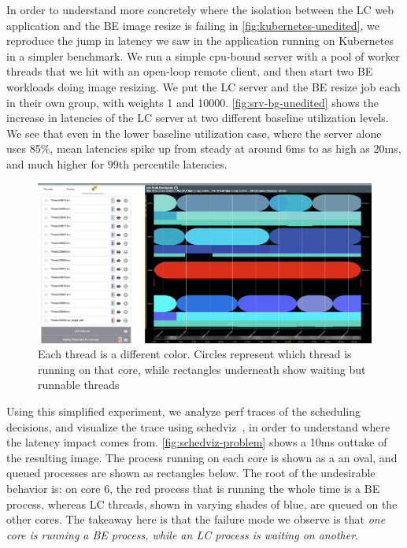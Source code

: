 In order to understand more concretely where the isolation between the LC web
application and the BE image resize is failing in
\autoref{fig:kubernetes-unedited}, we reproduce the jump in latency we saw in
the application running on Kubernetes in a simpler benchmark. We run a simple
cpu-bound server with a pool of worker threads that we hit with an open-loop
remote client, and then start two BE workloads doing image resizing. We put the
LC server and the BE resize job each in their own \cgroups{} group, with weights
1 and 10000. \autoref{fig:srv-bg-unedited} shows the increase in latencies of
the LC server at two different baseline utilization levels. We see that even in
the lower baseline utilization case, where the server alone uses 85\%, mean
latencies spike up from steady at around 6ms to as high as 20ms, and much higher
for 99th percentile latencies.

\begin{figure}[t]
    \centering
    \includegraphics[width=\columnwidth]{graphs/schedviz-problem.png}
    \caption{Each thread is a different color. Circles represent which
    thread is running on that core, while rectangles underneath show waiting but
    runnable threads
    }\label{fig:schedviz-problem}
\end{figure}

Using this simplified experiment, we analyze perf traces of the scheduling
decisions, and visualize the trace using schedviz~\cite{schedviz-tool}, in order
to understand where the latency impact comes from.
\autoref{fig:schedviz-problem} shows a 10ms outtake of the resulting image. The
process running on each core is shown as a an oval, and queued processes are
shown as rectangles below. The root of the undesirable behavior is: on core 6,
the red process that is running the whole time is a BE process, whereas LC
threads, shown in varying shades of blue, are queued on the other cores. The
takeaway here is that the failure mode we observe is that \textit{one core is
running a BE process, while an LC process is waiting on another}.

